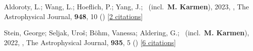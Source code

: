 \item[{\color{numcolor}\scriptsize2}] Aldoroty, L.; Wang, L.; Hoeflich, P.; Yang, J.; \etal\ (incl.\ \textbf{M. Karmen}), 2023, , The Astrophysical Journal, \textbf{948}, 10 () [\href{https://ui.adsabs.harvard.edu/abs/2023ApJ...948...10A}{2 citations}]

\item[{\color{numcolor}\scriptsize1}] Stein, George; Seljak, Uro{\v{s}}; B{\"o}hm, Vanessa; Aldering, G.; \etal\ (incl.\ \textbf{M. Karmen}), 2022, , The Astrophysical Journal, \textbf{935}, 5 () [\href{https://ui.adsabs.harvard.edu/abs/2022ApJ...935....5S}{6 citations}]